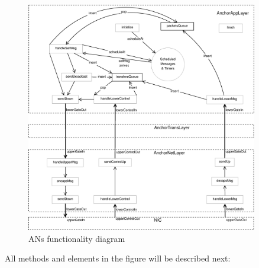 \begin{figure}[ht]
 \begin{center}
  \includegraphics[width=0.9\textwidth]{ANschema.eps}
 \end{center}
 \caption{\acp{AN} functionality diagram}
 \label{fig:ANschema}
\end{figure}

All methods and elements in the figure will be described next:

